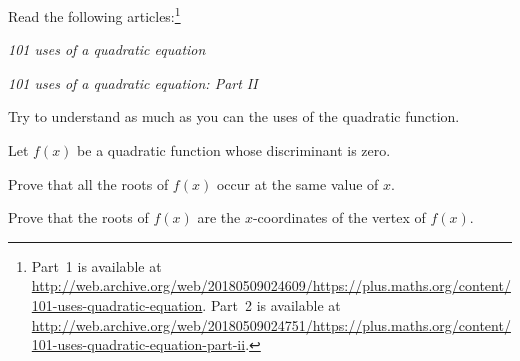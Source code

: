 \documentclass[a4paper,oneside,12pt]{article}
\begin{document}
\begin{problem}
\item Read the following articles:\footnote{
    Part~1 is available at
    \url{http://web.archive.org/web/20180509024609/https://plus.maths.org/content/101-uses-quadratic-equation}.
    Part~2 is available at
    \url{http://web.archive.org/web/20180509024751/https://plus.maths.org/content/101-uses-quadratic-equation-part-ii}.
  }

  \begin{packeditem}
  \item \emph{101 uses of a quadratic equation}

  \item \emph{101 uses of a quadratic equation: Part II}
  \end{packeditem}
  Try to understand as much as you can the uses of the quadratic
  function.

\item\label{prob:zero_discriminant}
  Let $f(x)$ be a quadratic function whose discriminant is zero.
  \begin{packedenum}
  \item\label{subprob:zero_discriminant_unique_root}
    Prove that all the roots of $f(x)$ occur at the same value of
    $x$.

  \item\label{subprob:zero_discriminant_root_is_tip_point}
    Prove that the roots of $f(x)$ are the $x$-coordinates of the
    vertex of $f(x)$.
  \end{packedenum}
\end{problem}
\end{document}
